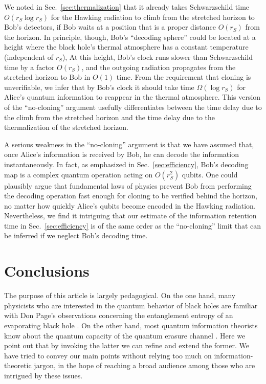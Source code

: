 \documentclass[12pt]{article}
\begin{document}
We noted in Sec.~\ref{sec:thermalization} that it already takes Schwarzschild time $O(r_S\log r_S)$ for the Hawking radiation to climb from the stretched horizon to Bob's detectors, if Bob waits at a position that is a proper distance $O(r_S)$ from the horizon. In principle, though, Bob's  ``decoding sphere'' could be located at a height where the black hole's thermal atmosphere has a constant temperature (independent of $r_S$), At this height, Bob's clock runs slower than Schwarzschild time by a factor $O(r_S)$, and the outgoing radiation propagates from the stretched horizon to Bob in $O(1)$ time. From the requirement that cloning is unverifiable, we infer that by Bob's clock it should take time $\Omega(\log r_S)$ for Alice's quantum information to reappear in the thermal atmosphere. This version of the ``no-cloning'' argument usefully differentiates between the time delay due to the climb from the stretched horizon and the time delay due to the thermalization of the stretched horizon.

A serious weakness in the ``no-cloning'' argument is that we have assumed that, once Alice's information is received by Bob, he can decode the information instantaneously. In fact, as emphasized in Sec.~\ref{sec:efficiency}, Bob's decoding map is a complex quantum operation acting on $O(r_S^2)$ qubits. One could plausibly argue that fundamental laws of physics prevent Bob from performing the decoding operation fast enough for cloning to be verified behind the horizon, no matter how quickly Alice's qubits become encoded in the Hawking radiation. Nevertheless, we find it intriguing that our estimate of the information retention time in Sec.~\ref{sec:efficiency} is of the same order as the ``no-cloning'' limit that can be inferred if we neglect Bob's decoding time.

\section{Conclusions}
The purpose of this article is largely pedagogical. On the one hand, many physicists who are interested in the quantum behavior of black holes are familiar with Don Page's observations concerning the entanglement entropy of an evaporating black hole \cite{page-entropy}. On the other hand, most quantum information theorists know about the quantum capacity of the quantum erasure channel \cite{thapliyal,quantum-erasure}. Here we point out that by invoking the latter we can refine and extend the former. We have tried to convey our main points without relying too much on information-theoretic jargon, in the hope of reaching a broad audience among those who are intrigued by these issues.
\end{document}
